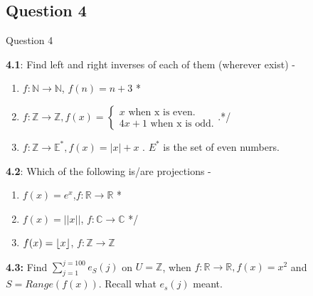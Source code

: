 \documentclass[xcolor=svgnames]{beamer}
\DeclarePairedDelimiter\floor{\lfloor}{\rfloor}
\begin{document}
\subsection{Question 4}
\begin{frame}{Question 4}
\footnotesize{
    \textbf{4.1}: Find left and right inverses of each of them (wherever exist) - 
    \begin{enumerate}
        \item $f: \mathbb{N} \rightarrow \mathbb{N}$, $f(n) = n + 3$
        \/*\item $f:\mathbb{Z} \rightarrow \mathbb{Z}, f(x) = \begin{cases} x \text{ when x is even.}\\ 4x + 1 \text{ when x is odd.}\end{cases}$.*/
        \item $f: \mathbb{Z} \rightarrow \mathbb{E}^*, f(x) = |x| +  x$ . $E^*$ is the set of even numbers.
    \end{enumerate}
    \textbf{4.2}: Which of the following is/are projections - 
    \begin{enumerate}
        \item $f(x) = e^x$,$f: \mathbb{R} \rightarrow \mathbb{R}$ 
        \/*\item $f(x) = ||x||$, $f: \mathbb{C} \rightarrow \mathbb{C}$ */
        \item $f(x) = \floor{x}$, $f: \mathbb{Z} \rightarrow \mathbb{Z}$
    \end{enumerate}
    \textbf{4.3:} Find $\sum_{j = 1}^{j = 100} e_{S}(j)$ on $U = \mathbb{Z}$, when $f: \mathbb{R} \rightarrow \mathbb{R}, f(x) = x^2$  and  $S = Range(f(x))$. Recall what $e_s(j)$ meant.
}
\end{frame}
\end{document}
